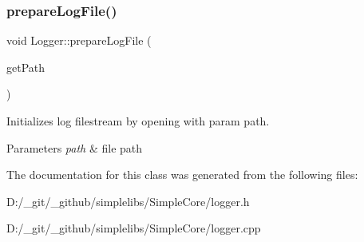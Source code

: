 \subsubsection{\texorpdfstring{prepareLogFile()}{prepareLogFile()}}
{\footnotesize\ttfamily void Logger\+::prepare\+Log\+File (\begin{DoxyParamCaption}\item[{const \mbox{\hyperlink{class_a_string}{A\+String}} \&}]{get\+Path }\end{DoxyParamCaption})\hspace{0.3cm}{\ttfamily [static]}}



Initializes log filestream by opening with param path. 


\begin{DoxyParams}{Parameters}
{\em path} & file path \\
\hline
\end{DoxyParams}


The documentation for this class was generated from the following files\+:\begin{DoxyCompactItemize}
\item 
D\+:/\+\_\+git/\+\_\+github/simplelibs/\+Simple\+Core/logger.\+h\item 
D\+:/\+\_\+git/\+\_\+github/simplelibs/\+Simple\+Core/logger.\+cpp\end{DoxyCompactItemize}
